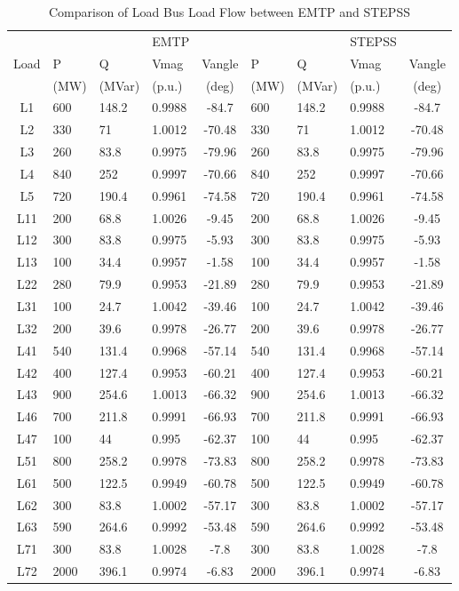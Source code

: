 \documentclass{report}
\begin{document}
\begin{table}
\centering
\caption{Comparison of Load Bus Load Flow between EMTP and STEPSS}
\begin{tabular}{c| l l l c| l l l c| } 
 & &  & EMTP &  & &  & STEPSS &  \\ 
Load & P  & Q & Vmag  & Vangle  & P & Q & Vmag & Vangle \\ 
& (MW) & (MVar) &  (p.u.) & (deg) & (MW) & (MVar) &  (p.u.) & (deg)\\
\hline
L1 & 600 & 148.2 & 0.9988 & -84.7 & 600 & 148.2 & 0.9988 & -84.7 \\
L2 & 330 & 71 & 1.0012 & -70.48 & 330 & 71 & 1.0012 & -70.48 \\
L3 & 260 & 83.8 & 0.9975 & -79.96 & 260 & 83.8 & 0.9975 & -79.96 \\
L4 & 840 & 252 & 0.9997 & -70.66 & 840 & 252 & 0.9997 & -70.66 \\
L5 & 720 & 190.4 & 0.9961 & -74.58 & 720 & 190.4 & 0.9961 & -74.58 \\
L11 & 200 & 68.8 & 1.0026 & -9.45 & 200 & 68.8 & 1.0026 & -9.45 \\
L12 & 300 & 83.8 & 0.9975 & -5.93 & 300 & 83.8 & 0.9975 & -5.93 \\
L13 & 100 & 34.4 & 0.9957 & -1.58 & 100 & 34.4 & 0.9957 & -1.58 \\
L22 & 280 & 79.9 & 0.9953 & -21.89 & 280 & 79.9 & 0.9953 & -21.89 \\
L31 & 100 & 24.7 & 1.0042 & -39.46 & 100 & 24.7 & 1.0042 & -39.46 \\
L32 & 200 & 39.6 & 0.9978 & -26.77 & 200 & 39.6 & 0.9978 & -26.77 \\
L41 & 540 & 131.4 & 0.9968 & -57.14 & 540 & 131.4 & 0.9968 & -57.14 \\
L42 & 400 & 127.4 & 0.9953 & -60.21 & 400 & 127.4 & 0.9953 & -60.21 \\
L43 & 900 & 254.6 & 1.0013 & -66.32 & 900 & 254.6 & 1.0013 & -66.32 \\
L46 & 700 & 211.8 & 0.9991 & -66.93 & 700 & 211.8 & 0.9991 & -66.93 \\
L47 & 100 & 44 & 0.995 & -62.37 & 100 & 44 & 0.995 & -62.37 \\
L51 & 800 & 258.2 & 0.9978 & -73.83 & 800 & 258.2 & 0.9978 & -73.83 \\
L61 & 500 & 122.5 & 0.9949 & -60.78 & 500 & 122.5 & 0.9949 & -60.78 \\
L62 & 300 & 83.8 & 1.0002 & -57.17 & 300 & 83.8 & 1.0002 & -57.17 \\
L63 & 590 & 264.6 & 0.9992 & -53.48 & 590 & 264.6 & 0.9992 & -53.48 \\
L71 & 300 & 83.8 & 1.0028 & -7.8 & 300 & 83.8 & 1.0028 & -7.8 \\
L72 & 2000 & 396.1 & 0.9974 & -6.83 & 2000 & 396.1 & 0.9974 & -6.83 \\

\end{tabular}
\label{Load}
\end{table}
\end{document}
